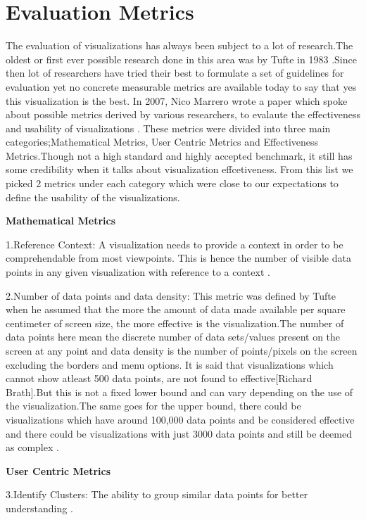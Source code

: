 \documentclass[seploa]{beavtex}
\begin{document}
\section{Evaluation Metrics}
The evaluation of visualizations has always been subject to a lot of research.The oldest or first ever possible research done in this area was by Tufte in 1983 \cite{tufte1983}.Since then lot of researchers have tried their best to formulate a set of guidelines for evaluation yet no concrete measurable metrics are available today to say that yes this visualization is the best. In 2007, Nico Marrero wrote a paper which spoke about possible metrics derived by various researchers, to evalaute the effectiveness and usability of visualizations \cite{nico2007}. These metrics were divided into three main categories;Mathematical Metrics, User Centric Metrics and Effectiveness Metrics.Though not a high standard and highly accepted benchmark, it still has some credibility when it talks about visualization effcetiveness. From this list we picked 2 metrics under each category which were close to our expectations to define the usability of the visualizations.


\textbf{Mathematical Metrics}

1.Reference Context: A visualization needs to provide a context in order to be comprehendable from most viewpoints. This is hence the number of visible data points in any given visualization with reference to a context \cite{brath1997}.

2.Number of data points and data density: This metric was defined by Tufte when he assumed that the more the amount of data made available per square centimeter of screen size, the more effective is the visualization.The number of data points here mean the discrete number of data sets/values present on the screen at any point and data density is the number of points/pixels on the screen excluding the borders and menu options. It is said that visualizations which cannot show atleast 500 data points, are not found to effective[Richard Brath].But this is not a fixed lower bound and can vary depending on the use of the visualization.The same goes for the upper bound, there could be visualizations which have around 100,000 data points and be considered effective and there could be visualizations with just 3000 data points and still be deemed as complex \cite{brath1997}.

\textbf{User Centric Metrics}

3.Identify Clusters: The ability to group similar data points for better understanding \cite{grins2001}.
\end{document}
